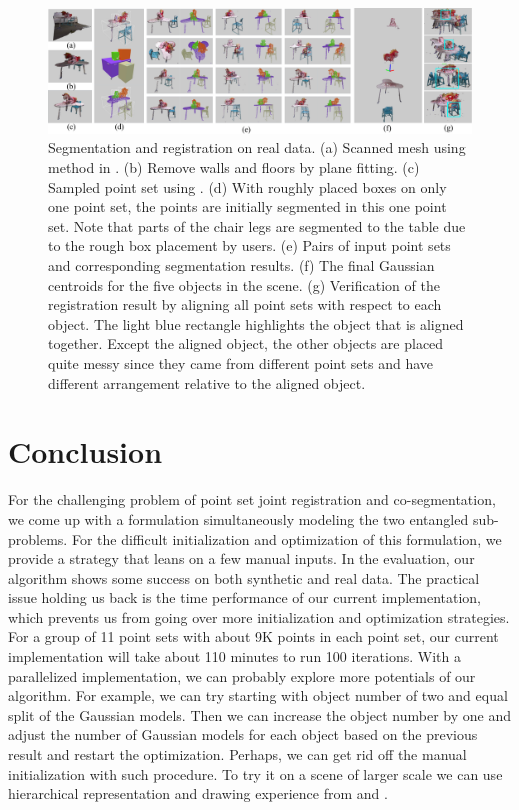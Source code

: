 \begin{figure}
	\centering
	\includegraphics[width=\linewidth]{images/realdata/realdata}
	\caption{\label{fig:realdata} Segmentation and registration on real data. (a) Scanned mesh using method in \cite{VXH}. (b) Remove walls and floors by plane fitting. (c) Sampled point set using \cite{PossionSampling}. (d) With roughly placed boxes on only one point set, the points are initially segmented in this one point set. Note that parts of the chair legs are segmented to the table due to the rough box placement by users. (e) Pairs of input point sets and corresponding segmentation results. (f) The final Gaussian centroids for the five objects in the scene. (g) Verification of the registration result by aligning all point sets with respect to each object. The light blue rectangle highlights the object that is aligned together. Except the aligned object, the other objects are placed quite messy since they came from different point sets and have different arrangement relative to the aligned object. %
	}
\end{figure} 
\section{Conclusion}
For the challenging problem of point set joint registration and co-segmentation, we come up with a formulation simultaneously modeling the two entangled sub-problems. For the difficult initialization and optimization of this formulation, we provide a strategy that leans on a few manual inputs. In the evaluation, our algorithm shows some success on both synthetic and real data.
The practical issue holding us back is the time performance of our current implementation, which prevents us from going over more initialization and optimization strategies. For a group of 11 point sets with about 9K points in each point set, our current implementation will take about 110 minutes to run 100 iterations.  
With a parallelized implementation, we can probably explore more potentials of our algorithm.
For example, we can try starting with object number of two and equal split of the Gaussian models. Then we can increase the object number by one and adjust the number of Gaussian models for each object based on the previous result and restart the optimization. Perhaps, we can get rid off the manual initialization with such procedure. To try it on a scene of larger scale we can use hierarchical representation and drawing experience from \cite{GOGMA} and \cite{AGM}. 